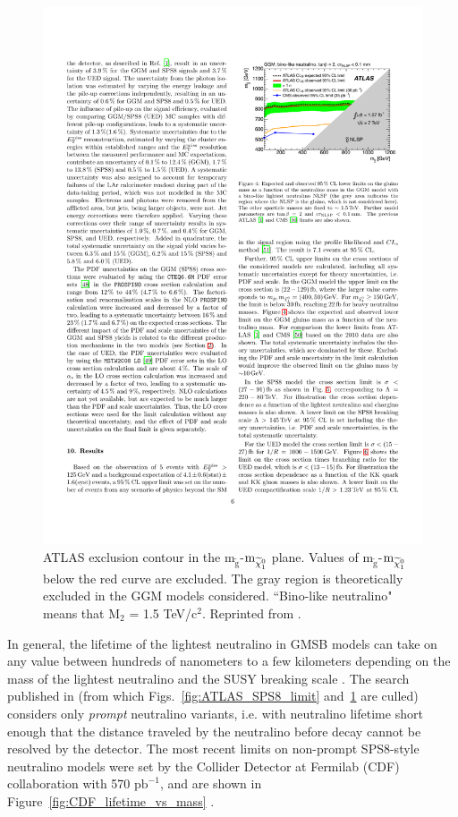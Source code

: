 \documentclass[dissertation.tex]{subfiles}
\begin{document}
\begin{figure}
	\centering
	\includegraphics[scale=0.9]{ATLAS_GGM_limit}
	\caption{ATLAS exclusion contour in the $\mbox{m}_{\widetilde{\mbox{g}}}$-$\mbox{m}_{\widetilde{\chi}_{1}^{0}}$ plane.  Values of $\mbox{m}_{\widetilde{\mbox{g}}}$-$\mbox{m}_{\widetilde{\chi}_{1}^{0}}$ below the red curve are excluded.  The gray region is theoretically excluded in the GGM models considered.  ``Bino-like neutralino" means that $\mbox{M}_{2}$ = 1.5 TeV/$\mbox{c}^{2}$.  Reprinted from \cite{ATLAS_GMSB_1fb-1}.}
	\label{fig:ATLAS_GGM_limit}
\end{figure}

In general, the lifetime of the lightest neutralino in GMSB models can take on any value between hundreds of nanometers to a few kilometers depending on the mass of the lightest neutralino and the SUSY breaking scale \cite{SUSY_primer}.  The search published in \cite{ATLAS_GMSB_1fb-1} (from which Figs.~\ref{fig:ATLAS_SPS8_limit} and~\ref{fig:ATLAS_GGM_limit} are culled) considers only \textit{prompt} neutralino variants, i.e. with neutralino lifetime short enough that the distance traveled by the neutralino before decay cannot be resolved by the detector.  The most recent limits on non-prompt SPS8-style neutralino models were set by the Collider Detector at Fermilab (CDF) collaboration with 570 $\mbox{pb}^{-1}$, and are shown in Figure~\ref{fig:CDF_lifetime_vs_mass} \cite{CDF_2010_GMSB_paper}.
\end{document}
